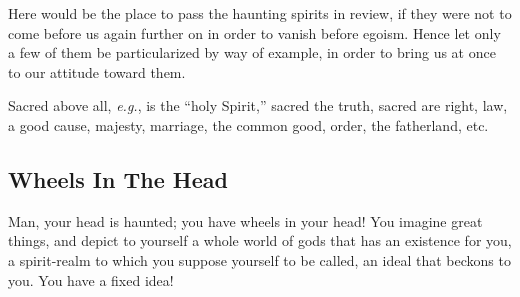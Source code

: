 \documentclass[12pt,a4paper]{book}
\begin{document}
Here would be the place to pass the haunting spirits in review, if they were 
not to come before us again further on in order to vanish before egoism. Hence 
let only a few of them be particularized by way of example, in order to bring 
us at once to our attitude toward them.

Sacred above all, \textit{e.g.}, is the ``holy Spirit,'' sacred the truth, 
sacred are right, law, a good cause, majesty, marriage, the common good, 
order, the fatherland, etc.

\subsection[Wheels In The Head]{\centering Wheels In The Head}

Man, your head is haunted; you have wheels in your head! You imagine great 
things, and depict to yourself a whole world of gods that has an existence for 
you, a spirit-realm to which you suppose yourself to be called, an ideal that 
beckons to you. You have a fixed idea!
\end{document}
